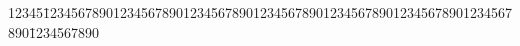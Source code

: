


\author{}
\title{}

{\small
\begin{tabbing}
12345\=1234567890123456789012345678901234567890123456789012345678901234567890\=1234567890 \kill



\end{tabbing}
}


